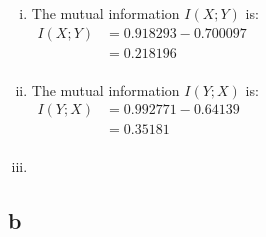 \documentclass[letterpaper,notitlepage,twoside]{article}
\begin{document}
\begin{enumerate}[(i)]
\item The mutual information $I(X ; Y)$ is: \\
$\begin{aligned}
I(X;Y) &= 0.918293 - 0.700097 \\ 
&= 0.218196 \\
\end{aligned}$

\item The mutual information $I(Y ; X)$ is: \\
$\begin{aligned}
I(Y;X) &= 0.992771 - 0.64139 \\
&= 0.35181 \\
\end{aligned}$

\item

\end{enumerate}

\subsection*{b}
\end{document}
